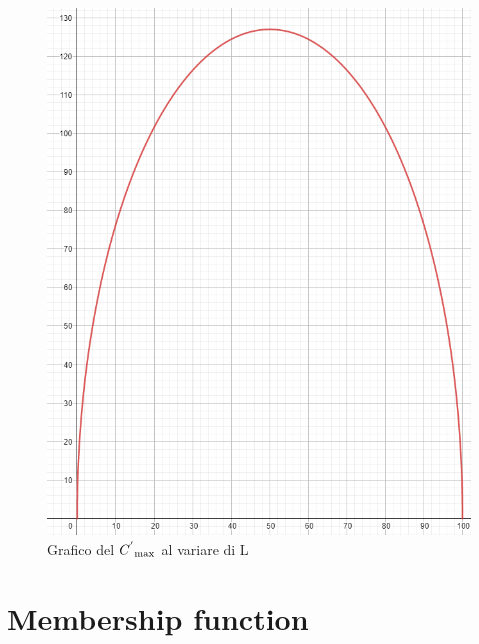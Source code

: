 \begin{figure}
	\includegraphics[scale=0.5]{images/geogebra-export.png}
\caption{Grafico del \({C^{'}}\textsubscript{max}\) al variare di L}
\end{figure}

\section{Membership function}